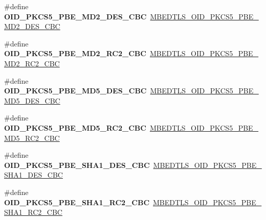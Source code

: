 \begin{DoxyCompactItemize}
\mbox{\label{compat-1_83_8h_aa74a6e95d538e8a1c3380ce0be60bf58}} 
\#define {\bfseries O\+I\+D\+\_\+\+P\+K\+C\+S5\+\_\+\+P\+B\+E\+\_\+\+M\+D2\+\_\+\+D\+E\+S\+\_\+\+C\+BC}~\mbox{\hyperlink{oid_8h_aee89ea0c0a0b7e9638df339d5a4ed27a}{M\+B\+E\+D\+T\+L\+S\+\_\+\+O\+I\+D\+\_\+\+P\+K\+C\+S5\+\_\+\+P\+B\+E\+\_\+\+M\+D2\+\_\+\+D\+E\+S\+\_\+\+C\+BC}}
\item 
\mbox{\label{compat-1_83_8h_a95facbdf4d03aa580defa390221f6f32}} 
\#define {\bfseries O\+I\+D\+\_\+\+P\+K\+C\+S5\+\_\+\+P\+B\+E\+\_\+\+M\+D2\+\_\+\+R\+C2\+\_\+\+C\+BC}~\mbox{\hyperlink{oid_8h_a64ee777837203609ebde78bd66e82e84}{M\+B\+E\+D\+T\+L\+S\+\_\+\+O\+I\+D\+\_\+\+P\+K\+C\+S5\+\_\+\+P\+B\+E\+\_\+\+M\+D2\+\_\+\+R\+C2\+\_\+\+C\+BC}}
\item 
\mbox{\label{compat-1_83_8h_a50cec8b7e2f8c36335ade6c486299cf1}} 
\#define {\bfseries O\+I\+D\+\_\+\+P\+K\+C\+S5\+\_\+\+P\+B\+E\+\_\+\+M\+D5\+\_\+\+D\+E\+S\+\_\+\+C\+BC}~\mbox{\hyperlink{oid_8h_ab9cd0427ee90eb79955efa41fb44534e}{M\+B\+E\+D\+T\+L\+S\+\_\+\+O\+I\+D\+\_\+\+P\+K\+C\+S5\+\_\+\+P\+B\+E\+\_\+\+M\+D5\+\_\+\+D\+E\+S\+\_\+\+C\+BC}}
\item 
\mbox{\label{compat-1_83_8h_aa0b452da4998a72f4fbc05a6e014f23d}} 
\#define {\bfseries O\+I\+D\+\_\+\+P\+K\+C\+S5\+\_\+\+P\+B\+E\+\_\+\+M\+D5\+\_\+\+R\+C2\+\_\+\+C\+BC}~\mbox{\hyperlink{oid_8h_ad6a00394222f6c6312802768c2c27ca9}{M\+B\+E\+D\+T\+L\+S\+\_\+\+O\+I\+D\+\_\+\+P\+K\+C\+S5\+\_\+\+P\+B\+E\+\_\+\+M\+D5\+\_\+\+R\+C2\+\_\+\+C\+BC}}
\item 
\mbox{\label{compat-1_83_8h_aa00562c1aafd2fb9a7efe1802613f0cc}} 
\#define {\bfseries O\+I\+D\+\_\+\+P\+K\+C\+S5\+\_\+\+P\+B\+E\+\_\+\+S\+H\+A1\+\_\+\+D\+E\+S\+\_\+\+C\+BC}~\mbox{\hyperlink{oid_8h_a03134831a88ea1a585774a9caec44104}{M\+B\+E\+D\+T\+L\+S\+\_\+\+O\+I\+D\+\_\+\+P\+K\+C\+S5\+\_\+\+P\+B\+E\+\_\+\+S\+H\+A1\+\_\+\+D\+E\+S\+\_\+\+C\+BC}}
\item 
\mbox{\label{compat-1_83_8h_aad68d78cf22449efab4205c75a5a5d3b}} 
\#define {\bfseries O\+I\+D\+\_\+\+P\+K\+C\+S5\+\_\+\+P\+B\+E\+\_\+\+S\+H\+A1\+\_\+\+R\+C2\+\_\+\+C\+BC}~\mbox{\hyperlink{oid_8h_a40e3bd9eca60a7f7eda16578af8a1df2}{M\+B\+E\+D\+T\+L\+S\+\_\+\+O\+I\+D\+\_\+\+P\+K\+C\+S5\+\_\+\+P\+B\+E\+\_\+\+S\+H\+A1\+\_\+\+R\+C2\+\_\+\+C\+BC}}

\end{DoxyCompactItemize}
